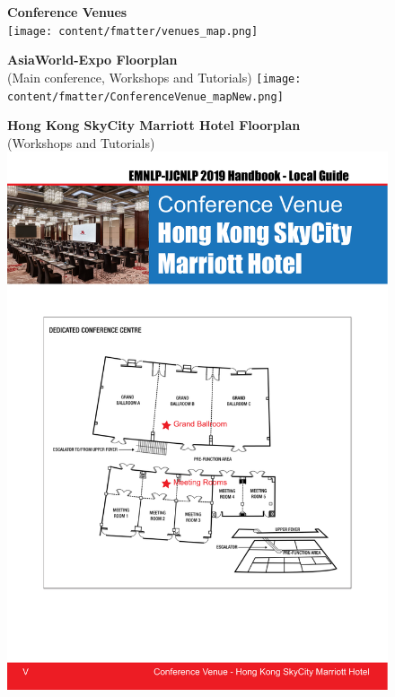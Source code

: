 

\begin{figure}[p]
\centering
\textbf{Conference Venues}\\
\vspace{3em}
\texttt{[image: content/fmatter/venues\_map.png]}
\end{figure}

\begin{figure}[p]
\centering
\textbf{AsiaWorld-Expo Floorplan}\\
(Main conference, Workshops and Tutorials)
\vspace{3em}
\texttt{[image: content/fmatter/ConferenceVenue\_mapNew.png]}
\end{figure}

\begin{figure}[p]
\centering
\textbf{Hong Kong SkyCity Marriott Hotel Floorplan}\\
(Workshops and Tutorials)
\vspace{10em}
\includegraphics[width=\textwidth]{content/fmatter/Marriott_map.pdf}
\end{figure}
